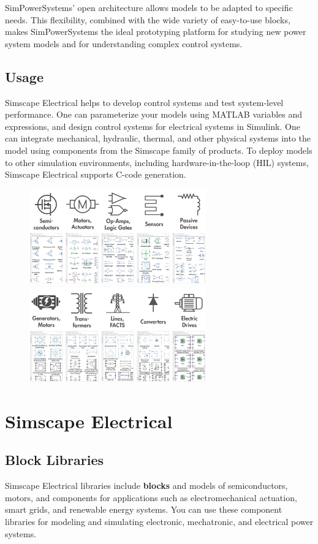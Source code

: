 \documentclass[a4paper,12pt]{article}
\begin{document}
    SimPowerSystems’ open architecture allows models to be adapted to specific
    needs. This flexibility, combined with the wide variety of easy-to-use blocks, makes
    SimPowerSystems the ideal prototyping platform for studying new power system
    models and for understanding complex control systems.
   
    \subsection{Usage}
    Simscape Electrical helps to develop control systems and test system-level 
    performance. One can parameterize your models using MATLAB variables and 
    expressions, and design control systems for electrical systems in Simulink. 
    One can integrate mechanical, hydraulic, thermal, and other physical systems 
    into the model using components from the Simscape family of products. 
    To deploy models to other simulation environments, including 
    hardware-in-the-loop (HIL) systems, Simscape Electrical supports C-code 
    generation.

  \begin{figure}[H]
    \centering
    \includegraphics[width=3in]{img/Screenshot (37).png}
    \includegraphics[width=3in]{img/Screenshot (38).png}
  \end{figure}

  \section{Simscape Electrical}
    \subsection{Block Libraries}
    Simscape Electrical libraries include {\bf blocks} and models of semiconductors, 
    motors, and components for applications such as electromechanical actuation, 
    smart grids, and renewable energy systems. You can use these component 
    libraries for modeling and simulating electronic, mechatronic, and electrical 
    power systems. 
\end{document}
